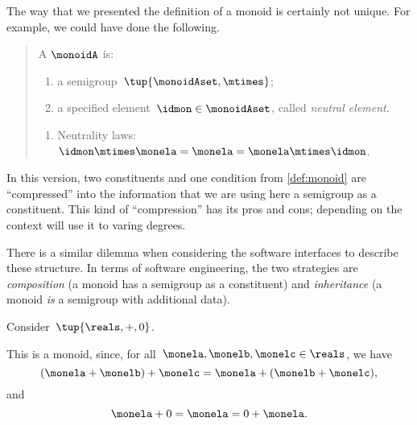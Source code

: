 \begin{remark}
    The way that we presented the definition of a monoid is certainly not unique. For example, we could have done the following.

    \begin{quote}
        A \emph{} $\monoidA$ is:
        \begin{body}
            \constit
            \begin{enumerate}
                \item a semigroup~$\tup{\monoidAset, \mtimes}$;
                \item a specified element~$\idmon\in \monoidAset$, called \emph{neutral element}.
            \end{enumerate}
            \condit
            \begin{enumerate}
                \item Neutrality laws:~$\idmon\mtimes \monela= \monela= \monela \mtimes \idmon$.
            \end{enumerate}
        \end{body}
    \end{quote}
    In this version, two constituents and one condition from \cref{def:monoid} are ``compressed'' into the information that we are using here a semigroup as a constituent. This kind of ``compression'' has its pros and cons; depending on the context will use it to varing degrees.

    There is a similar dilemma when considering the software interfaces to describe these structure.
    In terms of software engineering, the two strategies are \emph{composition} (a monoid has a semigroup as a constituent)
    and \emph{inheritance} (a monoid \emph{is} a semigroup with additional data).

\end{remark}



\begin{example}
    Consider~$\tup{\reals,+,0}$.

    This is a monoid, since, for all~$\monela,\monelb, \monelc \in \reals$, we have
    \begin{equation*}
    (\monela+\monelb)
        +\monelc=\monela+(\monelb+\monelc),
    \end{equation*}
    and
    \begin{equation*}
        \monela+0=\monela=0+\monela.
    \end{equation*}
\end{example}

